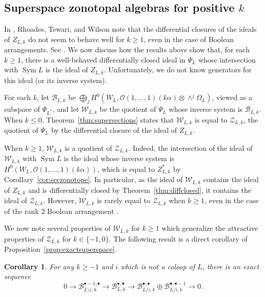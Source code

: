 \documentclass{amsart}
\newtheorem{corollary}[theorem]{Corollary}
\theoremstyle{definition}
\begin{document}
\subsection{Superspace zonotopal algebras for positive $k$}\label{ssec:positivek}

In \cite[Section 6.2]{Superspace}, Rhoades, Tewari, and Wilson note that the differential closures of the ideals of $Z_{L, k}$ do not seem to behave well for $k \ge 1$, even in the case of Boolean arrangements. See \cite[Example 6.3]{Superspace}. We now discuss how the results above show that, for each $k \ge 1$, there is a well-behaved differentially closed ideal in $\Psi_L$ whose intersection with $\operatorname{Sym} L$ is the ideal of $Z_{L, k}$. Unfortunately, we do not know generators for this ideal (or its inverse system). 

For each $k$, let $\mathcal{B}_{L, k}$ be $\bigoplus_j H^0(W_L, \mathcal{O}(1, \dotsc, 1)(k \alpha) \otimes \wedge^j \Omega_L)$, viewed as a subspace of $\Psi_{L^*}$, and let
$\mathcal{W}_{L, k}$ be the quotient of $\Psi_L$ whose inverse system is $\mathcal{B}_{L,k}$. 
When $k \le 0$, Theorem~\ref{thm:supersections} states that $\mathcal{W}_{L,k}$ is equal to $\mathcal{Z}_{L, k}$, the quotient of $\Psi_L$ by the differential closure of the ideal of $Z_{L, k}$. 

When $k \ge 1$, $\mathcal{W}_{L, k}$ is a quotient of $\mathcal{Z}_{L, k}$. Indeed, the intersection of the ideal of $\mathcal{W}_{L, k}$ with $\operatorname{Sym} L$ is the ideal whose inverse system is $H^0(W_L, \mathcal{O}(1, \dotsc, 1)(k\alpha))$, which is equal to $Z_{L, k}^*$ by Corollary~\ref{cor:seczonotope}. In particular, as the ideal of $\mathcal{W}_{L, k}$ contains the ideal of $Z_{L, k}$ and is differentially closed by Theorem~\ref{thm:diffclosed}, it contains the ideal of $\mathcal{Z}_{L, k}$. 
However, $\mathcal{W}_{L,k}$ is rarely equal to $\mathcal{Z}_{L, k}$ when $k \ge 1$, even in the case of the rank $2$ Boolean arrangement \cite[Example 6.3]{Superspace}. 

We now note several properties of $\mathcal{W}_{L, k}$ for $k \ge 1$ which generalize the attractive properties of $\mathcal{Z}_{L, k}$ for $k \in \{-1, 0\}$. The following result is a direct corollary of Proposition~\ref{prop:exactsuperspace}. 

\begin{corollary}
For any $k \ge -1$ and $i$ which is not a coloop of $L$, there is an exact sequence
$$0 \to \mathcal{B}_{L \setminus i, k}^{\bullet - 1, \bullet} \to \mathcal{B}_{L, k}^{\bullet, \bullet} \to \mathcal{B}_{L/i, k}^{\bullet, \bullet} \oplus \mathcal{B}_{L/i, k}^{\bullet, \bullet - 1} \to 0.$$
\end{corollary}
\end{document}
